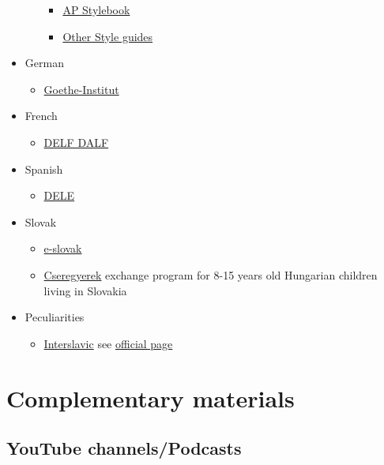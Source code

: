 \documentclass{article}
\begin{document}
\begin{itemize}
\begin{itemize}
\begin{itemize}
            \item \href{https://www.apstylebook.com/}{AP Stylebook}
            \item \href{https://en.wikipedia.org/wiki/Style_guide}{Other Style guides}
        \end{itemize}
    \end{itemize}
    \item German
    \begin{itemize}
        \item \href{https://www.goethe.de/en/index.html}{Goethe-Institut}
    \end{itemize}
    \item French
    \begin{itemize}
        \item \href{http://www.delfdalf.fr/index-en.html}{DELF DALF}
    \end{itemize}
    \item Spanish
    \begin{itemize}
        \item \href{https://www.dele.org/}{DELE}
    \end{itemize}
    \item Slovak
    \begin{itemize}
        \item \href{https://www.e-slovak.sk/}{e-slovak}
        \item \href{https://www.cseregyerek.sk/}{Cseregyerek} exchange program for 8-15 years old Hungarian children living in Slovakia 
    \end{itemize}
    \item Peculiarities
    \begin{itemize}
        \item \href{https://en.wikipedia.org/wiki/Interslavic}{Interslavic} see \href{http://interslavic-language.org/}{official page}
    \end{itemize}
\end{itemize}

\section{Complementary materials}

\subsection{YouTube channels/Podcasts}
\end{document}
